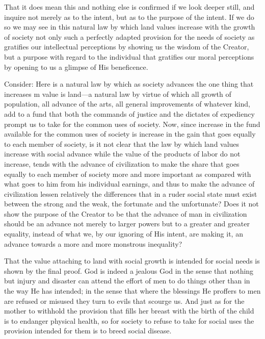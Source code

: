 \documentclass{book}
\begin{document}
That it does mean this and nothing else is confirmed if we look deeper still, and inquire not merely as to the intent, but as to the purpose of the intent. If we do so we may see in this natural law by which land values increase with the growth of society not only such a perfectly adapted provision for the needs of society as gratifies our intellectual perceptions by showing us the wisdom of the Creator, but a purpose with regard to the individual that gratifies our moral perceptions by opening to us a glimpse of His beneficence.

Consider: Here is a natural law by which as society advances the one thing that increases m value is land—a natural law by virtue of which all growth of population, all advance of the arts, all general improvements of whatever kind, add to a fund that both the commands of justice and the dictates of expediency prompt us to take for the common uses of society. Now, since increase in the fund available for the common uses of society is increase in the gain that goes equally to each member of society, is it not clear that the law by which land values increase with social advance while the value of the products of labor do not increase, tends with the advance of civilization to make the share that goes equally to each member of society more and more important as compared with what goes to him from his individual earnings, and thus to make the advance of civilization lessen relatively the differences that in a ruder social state must exist between the strong and the weak, the fortunate and the unfortunate? Does it not show the purpose of the Creator to be that the advance of man in civilization should be an advance not merely to larger powers but to a greater and greater equality, instead of what we, by our ignoring of His intent, are making it, an advance towards a more and more monstrous inequality?

That the value attaching to land with social growth is intended for social needs is shown by the final proof. God is indeed a jealous God in the sense that nothing but injury and disaster can attend the effort of men to do things other than in the way He has intended; in the sense that where the blessings He proffers to men are refused or misused they turn to evils that scourge us. And just as for the mother to withhold the provision that fills her breast with the birth of the child is to endanger physical health, so for society to refuse to take for social uses the provision intended for them is to breed social disease.
\end{document}
